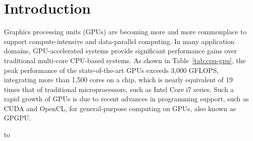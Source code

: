 
\section{Introduction}\label{sec:intro}

Graphics processing units (GPUs) are becoming more and more commonplace
to support compute-intensive and data-parallel computing.
In many application domains, GPU-accelerated systems provide significant
performance gains over traditional multi-core CPU-based systems.
As shown in Table~\ref{tab:cpu-gpu}, the peak performance of the
state-of-the-art GPUs exceeds 3,000 GFLOPS, integrating more than 1,500
cores on a chip, which is nearly equivalent of 19 times that of
traditional microprocessors, such as Intel Core i7 series.
Such a rapid growth of GPUs is due to recent advances in programming
support, such as CUDA\cite{cuda} and OpenCL\cite{opencl},  for
general-purpose computing on GPUs, also known as GPGPU.

\begin{table*}[tb]
 \caption{Comparison of the Intel CPU Architectures and the NVIDIA GPU
 Architectures}
 \label{tab:cpu-gpu}
 \begin{center}
  \hbox to
 \end{center}
\end{table*}

